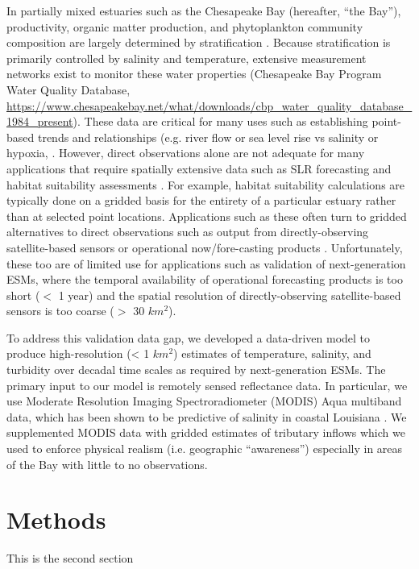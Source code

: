 \documentclass{article}
\begin{document}
In partially mixed estuaries such as the Chesapeake Bay (hereafter, “the Bay”), productivity, organic matter production, and phytoplankton community composition are largely determined by stratification \citep{xuClimateForcingSalinity2012}. Because stratification is primarily controlled by salinity and temperature, extensive measurement networks exist to monitor these water properties (Chesapeake Bay Program Water Quality Database, \url{https://www.chesapeakebay.net/what/downloads/cbp_water_quality_database_1984_present}). These data are critical for many uses such as establishing point-based trends and relationships (e.g. river flow or sea level rise vs salinity or hypoxia, \citet{hagyHypoxiaChesapeakeBay2004}. However, direct observations alone are not adequate for many applications that require spatially extensive data such as SLR forecasting and habitat suitability assessments \citep{hoodChesapeakeBayProgram2021}. For example, habitat suitability calculations are typically done on a gridded basis for the entirety of a particular estuary rather than at selected point locations. Applications such as these often turn to gridded alternatives to direct observations such as output from directly-observing satellite-based sensors \citep{foreCombinedActivePassive2016} or operational now/fore-casting products \citep{lanerolle2011second}. Unfortunately, these too are of limited use for applications such as validation of next-generation ESMs, where the temporal availability of operational forecasting products is too short ($<$ 1 year) and the spatial resolution of directly-observing satellite-based sensors is too coarse ($>$ 30 $km^2$).

To address this validation data gap, we developed a data-driven model to produce high-resolution (< 1 $km^2$) estimates of temperature, salinity, and turbidity over decadal time scales as required by next-generation ESMs. The primary input to our model is remotely sensed reflectance data. In particular, we use Moderate Resolution Imaging Spectroradiometer (MODIS) Aqua multiband data, which has been shown to be predictive of salinity in coastal Louisiana \citep{wangDevelopmentMODISData2018}. We supplemented MODIS data with gridded estimates of tributary inflows which we used to enforce physical realism (i.e. geographic “awareness”) especially in areas of the Bay with little to no observations.

\section{Methods}
This is the second section
\end{document}
